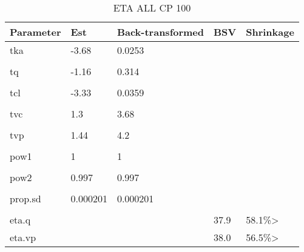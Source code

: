 \begin{table}
\centering\centering
\caption{ETA ALL CP 100}
\centering
\fontsize{8}{10}\selectfont
\begin{tabular}[t]{lllll}
\toprule
\textbf{Parameter} & \textbf{Est} & \textbf{Back-transformed} & \textbf{BSV} & \textbf{Shrinkage}\\
\midrule
tka & -3.68 & 0.0253 &  & \\
\midrule\\
tq & -1.16 & 0.314 &  & \\
\midrule\\
tcl & -3.33 & 0.0359 &  & \\
\midrule\\
tvc & 1.3 & 3.68 &  & \\
\midrule\\
tvp & 1.44 & 4.2 &  & \\
\midrule\\
pow1 & 1 & 1 &  & \\
\midrule\\
pow2 & 0.997 & 0.997 &  & \\
\midrule\\
prop.sd & 0.000201 & 0.000201 &  & \\
\midrule\\
eta.q &  &  & 37.9 & 58.1\%>\\
\midrule
eta.vp &  &  & 38.0 & 56.5\%>\\
\bottomrule
\end{tabular}
\end{table}